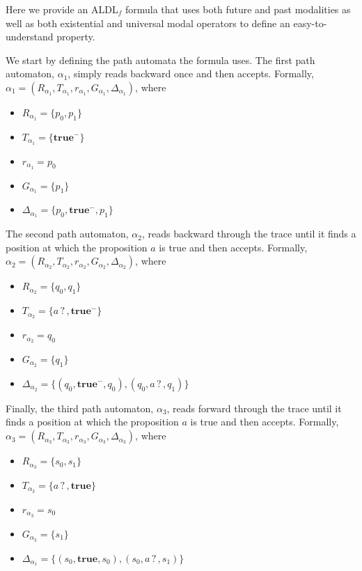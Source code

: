 \documentclass{lmcs}
\theoremstyle{definition}
\DeclareMathOperator{\?}{?}
\begin{document}
Here we provide an ALDL$_f$ formula that uses both future and past modalities as well as both existential and universal modal operators to define an easy-to-understand property.

We start by defining the path automata the formula uses. The first path automaton, $\alpha_1$, simply reads backward once and then accepts. Formally, $\alpha_1 = (R_{\alpha_1}, T_{\alpha_1}, r_{\alpha_1}, G_{\alpha_1}, \Delta_{\alpha_1})$, where


\begin{itemize}
  \item $R_{\alpha_1} = \{ p_0, p_1 \}$
  \item $T_{\alpha_1} = \{ \textbf{true}^- \}$
  \item $r_{\alpha_1} = p_0$
  \item $G_{\alpha_1} = \{ p_1  \}$
  \item $\Delta_{\alpha_1} = \{ p_0, \textbf{true}^-, p_1 \}$
\end{itemize}


The second path automaton, $\alpha_2$, reads backward through the trace until it finds a position at which the proposition $a$ is true and then accepts. Formally, $\alpha_2 = (R_{\alpha_2}, T_{\alpha_2}, r_{\alpha_2}, G_{\alpha_2}, \Delta_{\alpha_2})$, where

\begin{itemize}
  \item $R_{\alpha_2} = \{ q_0, q_1 \}$
  \item $T_{\alpha_2} = \{ a\?, \textbf{true}^- \}$
  \item $r_{\alpha_2} = q_0$
  \item $G_{\alpha_2} = \{ q_1 \}$
  \item $\Delta_{\alpha_2} = \{ (q_0, \textbf{true}^-, q_0), (q_0, a\?, q_1) \}$
\end{itemize}

Finally, the third path automaton, $\alpha_3$, reads forward through the trace until it finds a position at which the proposition $a$ is true and then accepts. Formally, $\alpha_3 = (R_{\alpha_3}, T_{\alpha_3}, r_{\alpha_3}, G_{\alpha_3}, \allowbreak\Delta_{\alpha_3})$, where


\begin{itemize}
  \item $R_{\alpha_3} = \{ s_0, s_1 \}$
  \item $T_{\alpha_3} = \{ a\?, \textbf{true} \}$
  \item $r_{\alpha_3} = s_0$
  \item $G_{\alpha_3} = \{ s_1 \}$
  \item $\Delta_{\alpha_1} = \{ (s_0, \textbf{true}, s_0), (s_0, a\?, s_1) \}$
\end{itemize}
\end{document}
